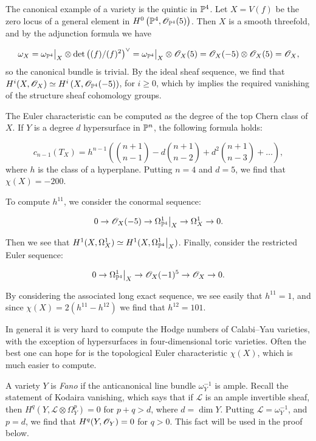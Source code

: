 \begin{example}
The canonical example of a \CY variety is the quintic in $\P^4$. Let $X=V(f)$ be the zero locus of a general element in $H^0\left(\P^4,\OO_{\P^4}(5)\right)$. Then $X$ is a smooth threefold, and by the adjunction formula we have 

\[
\omega_X = \restr{\omega_{\P^4}}{X} \otimes \det {\left( (f)/(f)^2 \right)}^\vee = \restr{\omega_{\P^4}}{X} \otimes \OO_X(5)=\OO_X(-5) \otimes \OO_X(5) = \OO_X,
\]
so the canonical bundle is trivial. By the ideal sheaf sequence, we find that $H^i(X,\OO_X) \simeq H^i\left(X,\OO_{\P^4}(-5)\right)$, for $i \geq 0$, which by \cite[Theorem 5.1, Chapter III]{hartshorne} implies the required vanishing of the structure sheaf cohomology groups.

The Euler characteristic can be computed as the degree of the top Chern class of $X$. If $Y$ is a degree $d$ hypersurface in $\P^n$, the following formula holds:

$$
c_{n-1}(T_X) = h^{n-1} \left( \binom{n+1}{n-1} - d \binom{n+1}{n-2} + d^2 \binom{n+1}{n-3} + \ldots\right),
$$
where $h$ is the class of a hyperplane. Putting $n=4$ and $d=5$, we find that $\chi(X)=-200$.

To compute $h^{11}$, we consider the conormal sequence:

\[
0 \to \OO_X(-5) \to \restr{\Omega_{\P^4}^1}{X} \to \Omega_X^1 \to 0.
\]

Then we see that $H^1(X,\Omega_X^1) \simeq H^1(X,\restr{\Omega_{\P^4}^1}{X})$. Finally, consider the restricted Euler sequence:

\[
0 \to \restr{\Omega_{\P^4}^1}{X} \to \OO_X(-1)^5  \to \OO_X \to 0.
\]

By considering the associated long exact sequence, we see easily that $h^{11}=1$, and since $\chi(X)=2(h^{11}-h^{12})$ we find that $h^{12}=101$.
\end{example}

In general it is very hard to compute the Hodge numbers of Calabi--Yau varieties, with the exception of hypersurfaces in four-dimensional toric varieties. Often the best one can hope for is the topological Euler characteristic $\chi(X)$, which is much easier to compute.

A variety $Y$ is \emph{Fano} if the anticanonical line bundle $\omega_Y^{-1}$ is ample. Recall the statement of Kodaira vanishing, which says that if $\mathscr L$ is an ample invertible sheaf, then $H^q(Y,\mathscr L \otimes \Omega_Y^p)=0$ for $p+q>d$, where $d=\dim Y$. Putting $\mathscr L=\omega_Y^{-1}$, and $p=d$, we find that $H^q(Y,\OO_Y)=0$ for $q > 0$. This fact will be used in the proof below.

